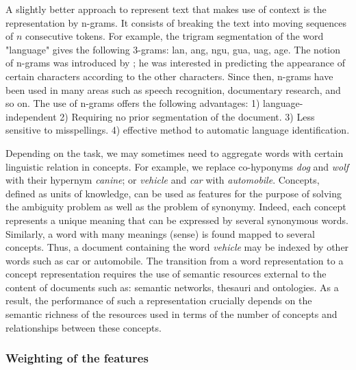 
A slightly better approach to represent text that makes use of context is the representation by n-grams. It consists of breaking the text into moving sequences of $n$ consecutive tokens. For example, the trigram segmentation of the word "language" gives the following 3-grams: lan, ang, ngu, gua, uag, age. The notion of n-grams was introduced by  \citep{shannon1948mathematical}; he was interested in predicting the appearance of certain characters according to the other characters. Since then, n-grams have been used in many areas such as speech recognition, documentary research, and so on. The use of n-grams offers the following advantages: 1) language-independent 2) Requiring no prior segmentation of the document. 3) Less sensitive to misspellings. 4) effective method to automatic language identification.



Depending on the task, we may sometimes need to aggregate words with certain linguistic relation in concepts. For example, we replace co-hyponyms \emph{dog} and \emph{wolf} with their hypernym \emph{canine}; or \emph{vehicle} and \emph{car} with \emph{automobile}. Concepts, defined as units of knowledge, can be used as features for the purpose of solving the ambiguity problem as well as the problem of synonymy. Indeed, each concept represents a unique meaning that can be expressed by several synonymous words. Similarly, a word with many meanings (sense) is found mapped to several concepts. Thus, a document containing the word \emph{vehicle} may be indexed by other words such as car or automobile. The transition from a word representation to a concept representation requires the use of semantic resources external to the content of documents such as: semantic networks, thesauri and ontologies. As a result, the performance of such a representation crucially depends on the semantic richness of the resources used in terms of the number of concepts and relationships between these concepts.

\subsubsection{Weighting of the features}

